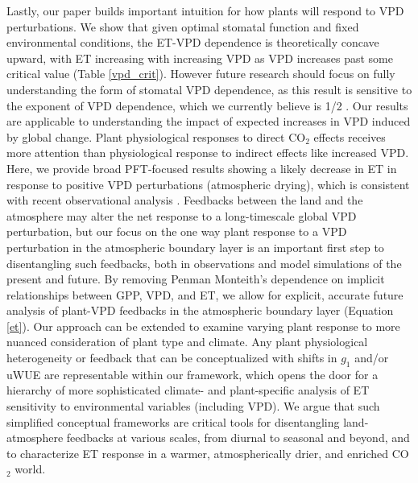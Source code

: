 \documentclass[draft,linenumbers]{afmjournal}
\begin{document}
Lastly, our paper builds important intuition for how plants will
respond to VPD perturbations. We show that given optimal stomatal
function and fixed environmental conditions, the ET-VPD dependence is
theoretically concave upward, with ET increasing with increasing VPD as
VPD increases past some critical value (Table \ref{vpd_crit}). However
future research should focus on fully understanding the form of
stomatal VPD dependence, as this result is sensitive to the exponent of
VPD dependence, which we currently believe is 1/2 \citep{MEDLYN_2011,
  Zhou_2014}. Our results are applicable to understanding the impact
of  expected increases in VPD
induced by global change.  Plant physiological responses to direct
CO$_2$ effects \citep[e.g.,][]{Swann_2016, Lemordant_2018} receives more attention
than physiological response to indirect effects like increased
VPD. Here, we provide broad PFT-focused results showing a likely
decrease in ET in response to positive VPD perturbations (atmospheric
drying), which is consistent with recent observational analysis
\citep[e.g.,][]{Rigden_2017}. Feedbacks between the land and the
atmosphere may alter the net response to a long-timescale global VPD perturbation,
but our focus on the one way plant response to a VPD perturbation in
the atmospheric boundary layer is an important first step to
disentangling such feedbacks, both in observations and model
simulations of the present and future. By removing Penman Monteith's
dependence on implicit relationships between GPP, VPD, and ET, we
allow for explicit, accurate future analysis of plant-VPD feedbacks
in the atmospheric boundary layer (Equation \ref{et}). Our approach
can be extended to examine varying plant response to more nuanced
consideration of plant type and climate. Any plant physiological
heterogeneity or feedback that can be conceptualized with shifts in $g_1$
\citep[e.g.][]{Lin_2015, Medlyn_2017} and/or uWUE
\citep[e.g.][]{Zhou_2014} are representable within our framework, which
opens the door for a hierarchy of more sophisticated climate- and
plant-specific analysis of ET sensitivity to environmental variables
(including VPD). We argue that such simplified conceptual frameworks
are critical tools for disentangling land-atmosphere feedbacks at
various scales, from diurnal to seasonal and beyond, and to
characterize ET response in a warmer, atmospherically drier, and
enriched CO$_2$ world.
\end{document}
